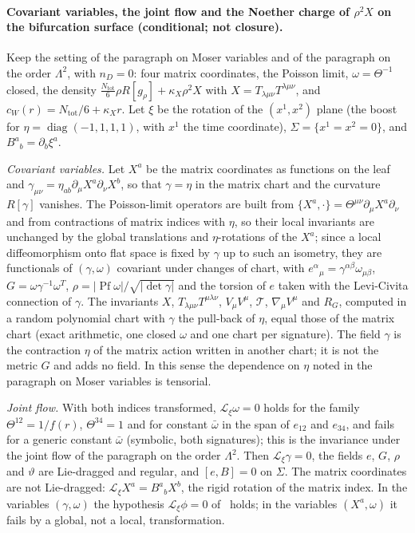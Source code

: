 \paragraph{Covariant variables, the joint flow and the Noether charge of \(\rho^2X\) on the bifurcation surface (conditional; not closure).}
Keep the setting of the paragraph on Moser variables and of the paragraph on the order \(\Lambda^2\), with \(n_D=0\): four matrix coordinates, the Poisson limit, \(\omega=\Theta^{-1}\) closed, the density \(\tfrac{N_{\mathrm{tot}}}6\rho R[g_\rho]+\kappa_X\rho^2X\) with \(X=T_{\lambda\mu\nu}T^{\lambda\mu\nu}\), and \(c_W(r)=N_{\mathrm{tot}}/6+\kappa_Xr\). Let \(\xi\) be the rotation of the \((x^1,x^2)\) plane (the boost for \(\eta=\operatorname{diag}(-1,1,1,1)\), with \(x^1\) the time coordinate), \(\Sigma=\{x^1=x^2=0\}\), and \(B^a{}_b=\partial_b\xi^a\).

\emph{Covariant variables.} Let \(X^a\) be the matrix coordinates as functions on the leaf and \(\gamma_{\mu\nu}=\eta_{ab}\partial_\mu X^a\partial_\nu X^b\), so that \(\gamma=\eta\) in the matrix chart and the curvature \(R[\gamma]\) vanishes. The Poisson-limit operators are built from \(\{X^a,\cdot\}=\Theta^{\mu\nu}\partial_\mu X^a\partial_\nu\) and from contractions of matrix indices with \(\eta\), so their local invariants are unchanged by the global translations and \(\eta\)-rotations of the \(X^a\); since a local diffeomorphism onto flat space is fixed by \(\gamma\) up to such an isometry, they are functionals of \((\gamma,\omega)\) covariant under changes of chart, with \(e^\alpha{}_\mu=\gamma^{\alpha\beta}\omega_{\mu\beta}\), \(G=\omega\gamma^{-1}\omega^T\), \(\rho=\lvert\operatorname{Pf}\omega\rvert/\sqrt{\lvert\det\gamma\rvert}\) and the torsion of \(e\) taken with the Levi-Civita connection of \(\gamma\). The invariants \(X\), \(T_{\lambda\mu\nu}T^{\mu\lambda\nu}\), \(V_\mu V^\mu\), \(\mathcal T\), \(\nabla_\mu V^\mu\) and \(R_G\), computed in a random polynomial chart with \(\gamma\) the pull-back of \(\eta\), equal those of the matrix chart (exact arithmetic, one closed \(\omega\) and one chart per signature). The field \(\gamma\) is the contraction \(\eta\) of the matrix action written in another chart; it is not the metric \(G\) and adds no field. In this sense the dependence on \(\eta\) noted in the paragraph on Moser variables is tensorial.

\emph{Joint flow.} With both indices transformed, \(\mathcal L_\xi\omega=0\) holds for the family \(\Theta^{12}=1/f(r)\), \(\Theta^{34}=1\) and for constant \(\bar\omega\) in the span of \(e_{12}\) and \(e_{34}\), and fails for a generic constant \(\bar\omega\) (symbolic, both signatures); this is the invariance under the joint flow of the paragraph on the order \(\Lambda^2\). Then \(\mathcal L_\xi\gamma=0\), the fields \(e\), \(G\), \(\rho\) and \(\vartheta\) are Lie-dragged and regular, and \([e,B]=0\) on \(\Sigma\). The matrix coordinates are not Lie-dragged: \(\mathcal L_\xi X^a=B^a{}_bX^b\), the rigid rotation of the matrix index. In the variables \((\gamma,\omega)\) the hypothesis \(\mathcal L_\xi\phi=0\) of~\cite{IyerWald1994} holds; in the variables \((X^a,\omega)\) it fails by a global, not a local, transformation.

